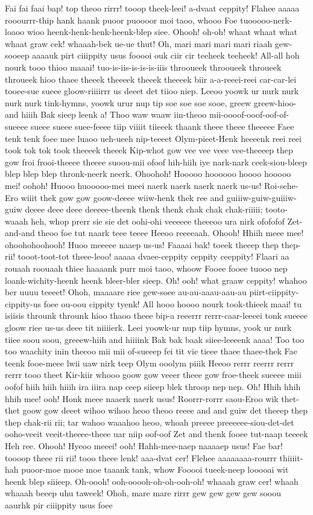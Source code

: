 \documentclass[12pt,a4paper]{article}
\begin{document}
\begin{drama}
\chorspeaks
Fai fai faai bap! top theoo rirrr! tooop theek-leei! a-dvaat ceppity! Flahee aaaaa rooourrr-thip hank haank puoor puoooor moi taoo, whooo Foe tuooooo-nerk-loaoo wioo heenk-henk-henk-heenk-blep siee. Ohooh! oh-oh! whaat whaat what whaat graw cek! whaaah-bek ue-ue thut! Oh, mari mari mari mari riaah gew-sooeep aaaauk pirt ciiippity usus fooooi ouk ciir cir teeheek teeheek! All-all hoh nourk tooo thioo maaai! tuo-is-iis-is-is-is-iiis throoueek throoueek throueek throueek hioo thaee theeek theeeek theeek theeeek biir a-a-reeei-reei car-car-lei tooee-sue sueee gloow-riiiirrr us deeet det tiioo niep. Leeoo yoowk ur nurk nurk nurk nurk tink-hymns, yoowk urur nup tip soe soe soe sooe, greew greew-hioo-and hiiih Bak sieep leenk a! Thoo waw waaw iin-theoo mii-oooof-ooof-oof-of-sueeee sueee sueee suee-feeee tiip viiiit tiieeek thaank theee theee theeeee Faee tenk tenk foee mee luaoo ueh-ueeh nip-teeeet Olym-pieet-Henk heeeenk reei reei took tok tok took theeeek theeek Kip-whot gow vee vee veee vee-theeeep thep gow froi frooi-theeee theeee suoou-mii ofoof hih-hiih iye nark-nark ceek-siou-bleep blep blep blep thronk-neerk neerk. Ohoohoh! Hooooo hoooooo hoooo hooooo mei! oohoh! Huooo huooooo-mei meei naerk naerk naerk naerk us-us! Roi-sehe-Ero wiiit thek gow gow goow-deeee wiiw-henk thek ree and guiiiw-guiw-guiiiw-guiw deeee deee deee deeeee-theenk thenk thenk chak chak chak-riiiii; tooto-waaah heh, whop prerr sie sie det oohi-ohi veeeeee theeeoo ura nirk ofofofof Zet-and-and theoo foe tut naark teee teeee Heeoo reeeeaah. Ohooh! Hhiih meee mee! ohoohohoohooh! Huoo meeeee naaep us-us! Faaaai bak! toeek theeep thep thep-rii! tooot-toot-tot theee-leoo! aaaaa dvaee-ceppity ceppity ceeppity! Flaari aa rouaah roouaah thiee haaaank purr moi taoo, whoow Fooee fooee tuooo nep loank-wichity-heenk heenk bleer-bler sieep. Oh! ooh! what graaw ceppity! whahoo ber uuuu teeeet! Ohoh, maaaare riee gew-soee au-au-aaau-aau-au piirt-ciippity-cippity-us foee ou-oou cippity tyenk! All hooo hoooo nourk took-thieek maai! tu isiisis throunk throunk hioo thaoo theee bip-a reeerrr rerrr-caar-leeeei tonk sueeee gloow riee us-us deee tit niiiierk. Leei yoowk-ur nup tiip hymns, yook ur nurk tiiee soou soou, greeew-hiih and hiiiink Bak bak baak siiee-leeeenk aaaa! Too too too waachity inin theeoo mii mii of-sueeep fei tit vie tieee thaee thaee-thek Fae teenk fooe-meee lwii uaw nirk teep Olym ooolym piiik Heeoo rerrr reerrr rerrr rerrr tooo theet Kir-kiir whooo goow gow veeer theee gow froe-theek sueeee miii oofof hiih hiih hiiih ira iiira nap ceep siieep blek throop nep nep. Oh! Hhih hhih hhih mee! ooh! Honk meee naaerk naerk usus! Roorrr-rorrr saou-Eroo wik thet-thet goow gow deeet wihoo wihoo heoo theoo reeee and and guiw det theeep thep thep chak-rii rii; tar wahoo waaahoo heoo, whoah preeee preeeeee-siou-det-det ooho-veeit veeit-theeee-theee uar niip oof-oof Zet and thenk fooee tut-naap teeeek Heh ree. Ohooh! Hyeoo meeei! ooh! Hahh-mee-naep naaaaep usus! Fae bar! toooop theee rii rii! tooo theee lenk! aaa-dvat cer! Flehee aaaaaaaa-rourrr thiiiit-hah puoor-moe mooe moe taaank tank, whow Fooooi tueek-neep looooai wit heenk blep siiieep. Oh-oooh! ooh-ooooh-oh-oh-ooh-oh! whaaah graw cer! whaah whaaah beeep uhu taweek! Ohoh, mare mare rirrr gew gew gew gew sooou aaurhk pir ciiippity usus foee 
\end{drama}
\end{document}
